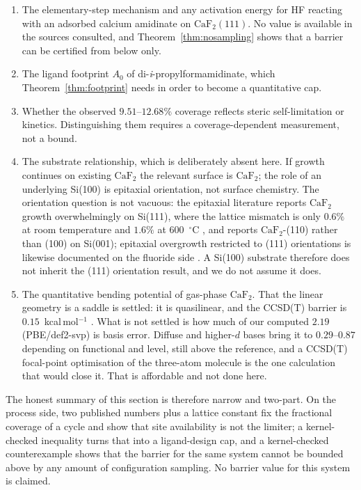 \documentclass[11pt,a4paper]{article}
\theoremstyle{plain}
\theoremstyle{definition}
\theoremstyle{remark}
\begin{document}
\begin{enumerate}
\item The elementary-step mechanism and any activation energy for
HF reacting with an adsorbed calcium amidinate on $\mathrm{CaF_2}(111)$. No
value is available in the sources consulted, and Theorem~\ref{thm:nosampling}
shows that a barrier can be certified from below only.
\item The ligand footprint $A_0$ of di-\emph{i}-propylformamidinate, which
Theorem~\ref{thm:footprint} needs in order to become a quantitative cap.
\item Whether the observed $9.51$--$12.68\%$ coverage reflects steric
self-limitation or kinetics. Distinguishing them requires a coverage-dependent
measurement, not a bound.
\item The substrate relationship, which is deliberately absent here. If growth
continues on existing $\mathrm{CaF_2}$ the relevant surface is $\mathrm{CaF_2}$;
the role of an underlying Si(100) is epitaxial orientation, not surface
chemistry. The orientation question is not vacuous: the epitaxial literature
reports $\mathrm{CaF_2}$ growth overwhelmingly on Si(111), where the lattice
mismatch is only $0.6\%$ at room temperature and $1.6\%$ at $600$~$^\circ$C
\citep{Pilvi2007}, and reports $\mathrm{CaF_2}$-(110) rather than (100) on
Si(001); epitaxial overgrowth restricted to (111) orientations is likewise
documented on the fluoride side \citep{Chan2010}. A Si(100) substrate therefore
does not inherit the (111) orientation
result, and we do not assume it does.
\item The quantitative bending potential of gas-phase $\mathrm{CaF_2}$. That the
linear geometry is a saddle is settled: it is quasilinear, and the CCSD(T) barrier
is $0.15$~kcal\,mol$^{-1}$ \citep{Koput2004}. What is not settled is how much of
our computed $2.19$ (PBE/def2-svp) is basis error. Diffuse and higher-$d$ bases
bring it to $0.29$--$0.87$ depending on functional and level, still above the
reference, and a CCSD(T) focal-point optimisation of the three-atom molecule is the
one calculation that would close it. That is affordable and not done here.
\end{enumerate}

The honest summary of this section is therefore narrow and two-part. On the process
side, two published numbers plus a lattice constant fix the fractional coverage of
a cycle and show that site availability is not the limiter; a kernel-checked
inequality turns that into a ligand-design cap, and a kernel-checked counterexample
shows that the barrier for the same system cannot be bounded above by any amount of
configuration sampling. No barrier value for this system is claimed.
\end{document}
